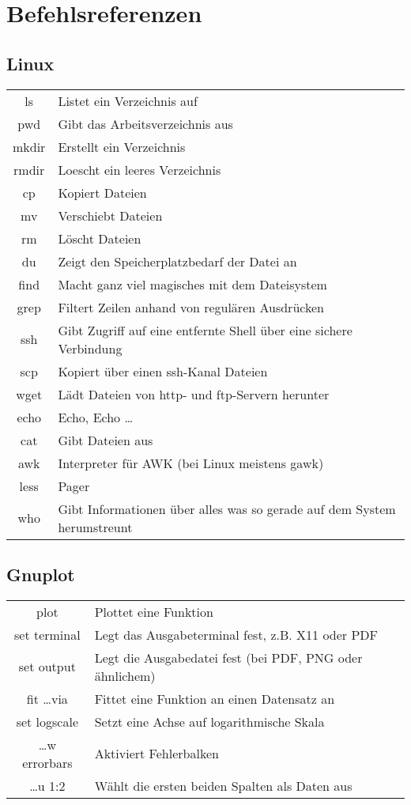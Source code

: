 \section{Befehlsreferenzen}
\subsection{Linux}
\begin{tabular}[h!]{cl}
  ls     & Listet ein Verzeichnis auf \\
  pwd    & Gibt das Arbeitsverzeichnis aus \\
  mkdir  & Erstellt ein Verzeichnis \\
  rmdir  & Loescht ein leeres Verzeichnis \\
  cp     & Kopiert Dateien \\
  mv     & Verschiebt Dateien \\
  rm     & Löscht Dateien \\
  du     & Zeigt den Speicherplatzbedarf der Datei an \\
  find   & Macht ganz viel magisches mit dem Dateisystem \\
  grep   & Filtert Zeilen anhand von regulären Ausdrücken \\
  ssh    & Gibt Zugriff auf eine entfernte Shell über eine sichere Verbindung \\
  scp    & Kopiert über einen ssh-Kanal Dateien \\
  wget   & Lädt Dateien von http- und ftp-Servern herunter \\
  echo   & Echo, Echo \ldots \\
  cat    & Gibt Dateien aus \\
  awk    & Interpreter für AWK (bei Linux meistens gawk) \\
  less   & Pager \\
  who    & Gibt Informationen über alles was so gerade auf dem System
           herumstreunt
\end{tabular}

\subsection{Gnuplot}
\begin{tabular}[h!]{cl}
  plot           & Plottet eine Funktion \\
  set terminal   & Legt das Ausgabeterminal fest, z.B. X11 oder PDF \\
  set output     & Legt die Ausgabedatei fest (bei PDF, PNG oder ähnlichem) \\
  fit \ldots via & Fittet eine Funktion an einen Datensatz an \\
  set logscale   & Setzt eine Achse auf logarithmische Skala \\
  \ldots w errorbars & Aktiviert Fehlerbalken \\
  \ldots u 1:2   & Wählt die ersten beiden Spalten als Daten aus
\end{tabular}

